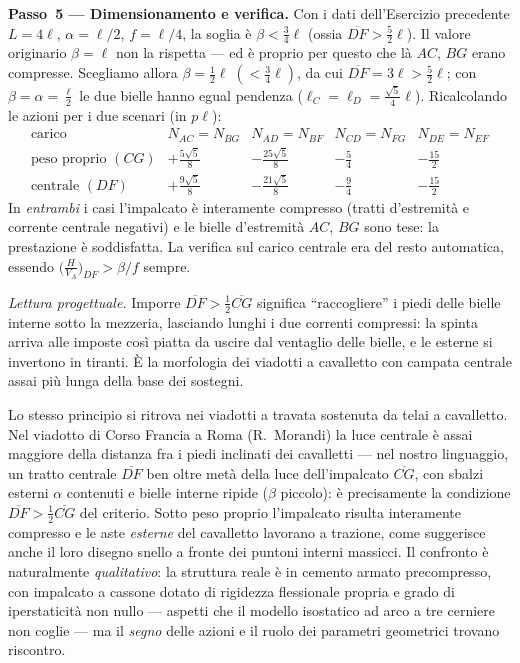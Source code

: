 \begin{esercizio}
	
	\medskip\noindent\textbf{Passo~5 --- Dimensionamento e verifica.}
	Con i dati dell'Esercizio precedente $L=4\ell$, $\alpha=\ell/2$, $f=\ell/4$, la soglia è $\beta<\tfrac34\ell$
	(ossia $\overline{DF}>\tfrac52\ell$). Il valore originario $\beta=\ell$ non la rispetta --- ed è proprio per
	questo che là $AC$, $BG$ erano compresse. Scegliamo allora $\beta=\tfrac12\ell\;(<\tfrac34\ell)$, da cui
	$\overline{DF}=3\ell>\tfrac52\ell$; con $\beta=\alpha=\tfrac\ell2$ le due bielle hanno egual pendenza
	($\ell_C=\ell_D=\tfrac{\sqrt5}{4}\ell$). Ricalcolando le azioni per i due scenari (in $p\ell$):
	\[
	\begin{array}{l|cccc}
		\text{carico} & N_{AC}=N_{BG} & N_{AD}=N_{BF} & N_{CD}=N_{FG} & N_{DE}=N_{EF}\\\hline
		\text{peso proprio } (CG) & +\tfrac{5\sqrt5}{8} & -\tfrac{25\sqrt5}{8} & -\tfrac54 & -\tfrac{15}{2}\\[2pt]
		\text{centrale } (DF) & +\tfrac{9\sqrt5}{8} & -\tfrac{21\sqrt5}{8} & -\tfrac94 & -\tfrac{15}{2}
	\end{array}
	\]
	In \emph{entrambi} i casi l'impalcato è interamente compresso (tratti d'estremità e corrente centrale
	negativi) e le bielle d'estremità $AC$, $BG$ sono tese: la prestazione è soddisfatta. La verifica sul
	carico centrale era del resto automatica, essendo $\big(\tfrac{H}{V_A}\big)_{DF}>\beta/f$ sempre.
	
	\medskip\noindent\emph{Lettura progettuale.} Imporre $\overline{DF}>\tfrac12\overline{CG}$ significa
	``raccogliere'' i piedi delle bielle interne sotto la mezzeria, lasciando lunghi i due correnti compressi:
	la spinta arriva alle imposte così piatta da uscire dal ventaglio delle bielle, e le esterne si invertono
	in tiranti. È la morfologia dei viadotti a cavalletto con campata centrale assai più lunga della base dei
	sostegni.
	
	\begin{oss}
		Lo stesso principio si ritrova nei viadotti a travata sostenuta da telai a cavalletto. Nel viadotto di
		Corso Francia a Roma (R.~Morandi) la luce centrale è assai maggiore della distanza fra i piedi inclinati
		dei cavalletti --- nel nostro linguaggio, un tratto centrale $\overline{DF}$ ben oltre metà della luce
		dell'impalcato $\overline{CG}$, con sbalzi esterni $\alpha$ contenuti e bielle interne ripide ($\beta$
		piccolo): è precisamente la condizione $\overline{DF}>\tfrac12\overline{CG}$ del criterio. Sotto peso
		proprio l'impalcato risulta interamente compresso e le aste \emph{esterne} del cavalletto lavorano a
		trazione, come suggerisce anche il loro disegno snello a fronte dei puntoni interni massicci. Il
		confronto è naturalmente \emph{qualitativo}: la struttura reale è in cemento armato precompresso, con
		impalcato a cassone dotato di rigidezza flessionale propria e grado di iperstaticità non nullo ---
		aspetti che il modello isostatico ad arco a tre cerniere non coglie --- ma il \emph{segno} delle azioni
		e il ruolo dei parametri geometrici trovano riscontro.
	\end{oss}
	
\end{esercizio}


